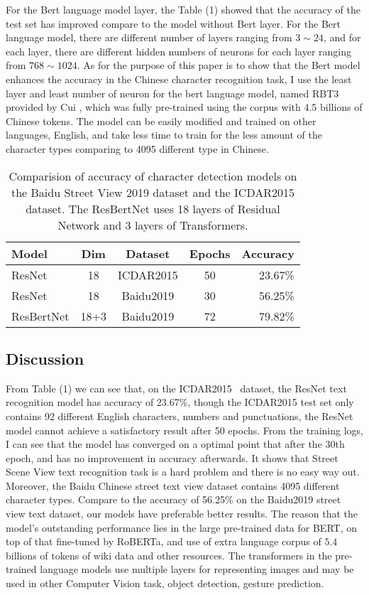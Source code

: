 \documentclass[review]{cvpr}
\begin{document}
For the Bert language model layer, the Table (1) showed that the accuracy of the test set has improved compare to the model without Bert layer.
For the Bert language model, there are different number of layers ranging from $3\sim24$, and for each layer,
there are different hidden numbers of neurons for each layer ranging from $768\sim1024$.
As for the purpose of this paper is to show that the Bert model enhances the accuracy in the Chinese character recognition task,
I use the least layer and least number of neuron for the bert language model, named RBT3 provided by Cui \etal,
which was fully pre-trained using the corpus with 4.5 billions of Chinese tokens.
The model can be easily modified and trained on other languages, \eg English,
and take less time to train for the less amount of the character types comparing to
4095 different type in Chinese.


\begin{table}
\begin{center}
\begin{tabular}{|l|c|c|c|r|}
\hline
Model & Dim & Dataset& Epochs & Accuracy \\
\hline\hline
ResNet      & 18 &  ICDAR2015     & 50 &	23.67\% \\
ResNet      & 18 &  Baidu2019	  & 30 &	56.25\% \\
ResBertNet  & 18+3 & Baidu2019    & 72	&	79.82\% \\
\hline
\end{tabular}
\end{center}
\caption{Comparision of accuracy of character detection models on the Baidu Street View 2019 dataset and the ICDAR2015 dataset.
The ResBertNet uses 18 layers of Residual Network and 3 layers of Transformers.}
\end{table}


\subsection{Discussion}

From Table (1) we can see that, on the ICDAR2015~\cite{karatzas2015icdar} dataset, the ResNet text recognition model has accuracy of 23.67\%,
though the ICDAR2015 test set only contains 92 different English characters, numbers and punctuations,
the ResNet model cannot achieve a satisfactory result after 50 epochs.
From the training logs, I can see that the model has converged on a optimal point that after the 30th epoch,
and has no improvement in accuracy afterwards.
It shows that Street Scene View text recognition task is a hard problem and there is no easy way out.
Moreover, the Baidu Chinese street text view dataset contains 4095 different character types.
Compare to the accuracy of 56.25\% on the Baidu2019 street view text dataset, our models have preferable better results.
The reason that the model's outstanding performance lies in the large pre-trained data for BERT, on top of that fine-tuned by RoBERTa, and use of extra language corpus of
$5.4$ billions of tokens of wiki data and other resources.
The transformers in the pre-trained language models use multiple layers for representing images and may be used in other Computer Vision task, \eg object detection, gesture prediction.
\end{document}
